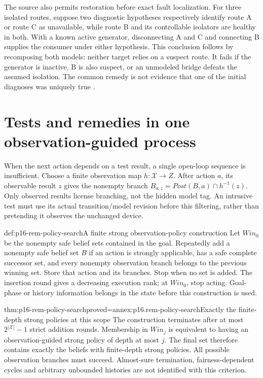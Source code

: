 The source also permits restoration before exact fault localization.
For three isolated routes, suppose two diagnostic hypotheses respectively
identify route A or route C as unavailable, while route B and its controllable
isolators are healthy in both. With a known active generator, disconnecting
A and C and connecting B supplies the consumer under either hypothesis.
This conclusion follows by recomposing both models: neither target relies
on a suspect route. It fails if the generator is inactive, B is also suspect,
or an unmodeled bridge defeats the assumed isolation. The common remedy
is not evidence that one of the initial diagnoses was uniquely true
\cite[p.~452]{Struss2008ModelBasedProblemSolving}.

\section{Tests and remedies in one observation-guided process}
\label{sec:p16-rem-policy}

When the next action depends on a test result, a single open-loop sequence
is insufficient. Choose a finite observation map \(h:\mathcal X\to Z\).
After action \(a\), its observable result \(z\) gives the nonempty
branch \(B_{a,z}=Post(B,a)\cap h^{-1}(z)\).
Only observed results license branching, not the hidden model tag.
An intrusive test must use its actual transition/model revision before
this filtering, rather than pretending it observes the unchanged device.

\begin{hbmethod}{def:p16-rem-policy-search}{A finite strong observation-policy construction}
Let \(Win_0\) be the nonempty safe belief sets contained in the goal.
Repeatedly add a nonempty safe belief set \(B\) if an action is strongly applicable,
has a safe complete successor set, and every nonempty observation branch
belongs to the previous winning set. Store that action and its branches.
Stop when no set is added. The insertion round gives a decreasing execution
rank; at \(Win_0\), stop acting. Goal-phase or history information belongs
in the state before this construction is used.
\end{hbmethod}

\begin{hbtheorem}{thm:p16-rem-policy-search}{proved=annex:p16.rem-policy-search}{Exactly the finite-depth strong policies at this scope}
The construction terminates after at most \(2^{|\mathcal X|}-1\)
strict addition rounds. Membership in \(Win_j\) is equivalent to having
an observation-guided strong policy of depth at most \(j\). The final
set therefore contains exactly the beliefs with finite-depth strong policies.
All possible observation branches must succeed. Almost-sure termination,
fairness-dependent cycles and arbitrary unbounded histories are not identified
with this criterion.
\end{hbtheorem}

